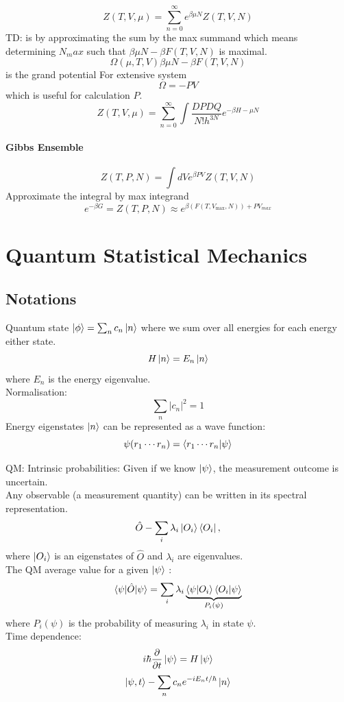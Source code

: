 \documentclass[11pt]{book}
\theoremstyle{definition}
\begin{document}
\[ Z(T,V,\mu) = \sum_{n=0}^{\infty} e^{\beta \mu N} Z(T,V,N) \] 
TD: is by approximating the sum by the max summand which means determining $ N_max $ such that $ \beta \mu N - \beta F(T,V,N) $ is maximal.
\[ \Omega(\mu, T, V)\beta \mu N - \beta F(T,V,N)  \] is the grand potential 
For extensive system
\[ \Omega = - PV \] 
which is useful for calculation $ P $.
\[ Z(T,V,\mu) = \sum_{n=0}^{\infty} \int \frac{DPDQ}{N!h^{3N}}e^{-\beta{H-\mu N}}\] 

\subsubsection{Gibbs Ensemble}%
\[ Z(T,P,N) = \int dV e^{\beta PV} Z(T,V,N)\] 
Approximate the integral by max integrand
\[ e^{-\beta G} =  Z(T,P,N) \approx e^{\beta (F(T,V_{\max}, N)) + PV_{max}} \]

\chapter{Quantum Statistical Mechanics}
\section*{Notations}
Quantum state $ \ket{\phi} = \sum_{n} c_n \ket{n} $
where we sum over all energies for each energy either state.
\[ H\ket{n} = E_n\ket{n} \] 
where $ E_n $ is the energy eigenvalue. \\
Normalisation:
\[ \sum_{n} |c_n|^2 = 1\] 
Energy eigenstates $ \ket{n} $ can be represented as a wave function:
\[ \psi(r_1 \cdots r_n) = \braket{r_1 \cdots r_n | \psi} \] 

QM: Intrinsic probabilities: Given if we know $ \ket{\psi} $, the measurement outcome is uncertain. \\
Any observable (a measurement quantity) can be written in its spectral representation.
\[ \hat O - \sum_{i} \lambda_i \ket{O_i}\bra{O_i}, \] where $ \ket{O_i} $ is an eigenstates of $ \hat O $ and $ \lambda_i $ are eigenvalues.\\
The QM average value for a given $ \ket{\psi} $ :
\[ \braket{\psi|\hat O|\psi} = \sum_i \lambda_i 
\underbrace{\braket{\psi|O_i} \braket{O_i|\psi}}_{P_i(\psi)}\] 
where $ P_i(\psi) $ is the probability of measuring $ \lambda_i $ in state $ \psi $.\\
Time dependence:
\[ i \hbar \frac{\partial }{\partial t} \ket{\psi} = H \ket{\psi}  \] 
\[ \ket{\psi,t} - \sum_{n} c_n e^{-iE_nt/\hbar} \ket{n} \] 
\end{document}
